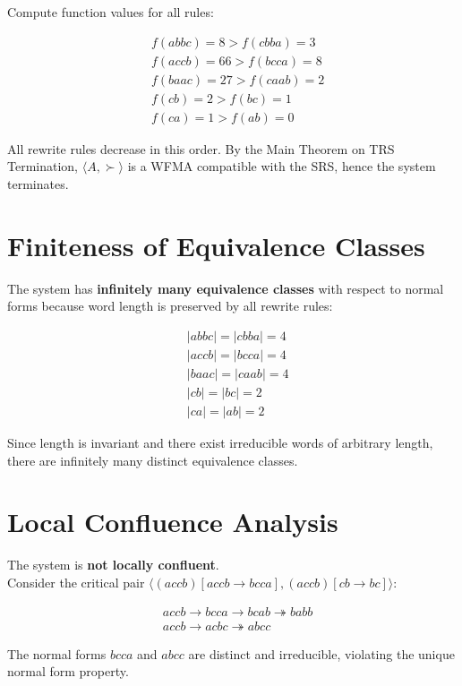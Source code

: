 \documentclass{article}
\begin{document}
Compute function values for all rules:

\begin{align*}
&f(abbc) = 8 > f(cbba) = 3 \\
&f(accb) = 66 > f(bcca) = 8 \\  
&f(baac) = 27 > f(caab) = 2 \\
&f(cb) = 2 > f(bc) = 1 \\
&f(ca) = 1 > f(ab) = 0
\end{align*}

All rewrite rules decrease in this order. By the Main Theorem on TRS Termination, $\langle A, \succ \rangle$ is a WFMA compatible with the SRS, hence the system terminates.

\section{Finiteness of Equivalence Classes}

The system has \textbf{infinitely many equivalence classes} with respect to normal forms because word length is preserved by all rewrite rules:

\begin{align*}
&|abbc| = |cbba| = 4 \\
&|accb| = |bcca| = 4 \\
&|baac| = |caab| = 4 \\  
&|cb| = |bc| = 2 \\
&|ca| = |ab| = 2
\end{align*}

Since length is invariant and there exist irreducible words of arbitrary length, there are infinitely many distinct equivalence classes.

\section{Local Confluence Analysis}

The system is \textbf{not locally confluent}. \\
Consider the critical pair $\langle (accb)[accb \to bcca], (accb)[cb \to bc] \rangle$:

\begin{align*}
&accb \to bcca \to  bcab \twoheadrightarrow babb\\
&accb \to acbc \twoheadrightarrow abcc
\end{align*}

The normal forms $bcca$ and $abcc$ are distinct and irreducible, violating the unique normal form property.
\end{document}
